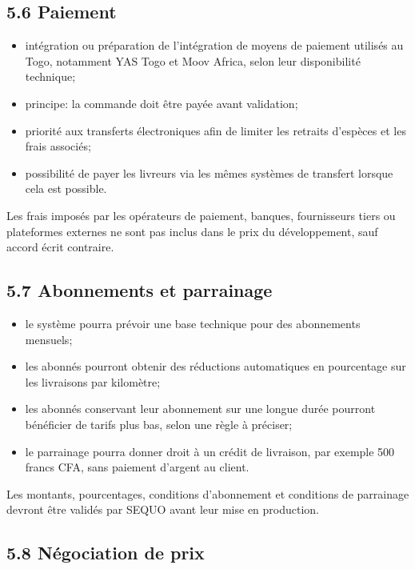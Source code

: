 \documentclass[11pt,a4paper]{article}
\begin{document}
\subsection*{5.6 Paiement}

\begin{itemize}
    \item intégration ou préparation de l'intégration de moyens de paiement utilisés au Togo, notamment YAS Togo et Moov Africa, selon leur disponibilité technique;
    \item principe: la commande doit être payée avant validation;
    \item priorité aux transferts électroniques afin de limiter les retraits d'espèces et les frais associés;
    \item possibilité de payer les livreurs via les mêmes systèmes de transfert lorsque cela est possible.
\end{itemize}

Les frais imposés par les opérateurs de paiement, banques, fournisseurs tiers ou plateformes externes ne sont pas inclus dans le prix du développement, sauf accord écrit contraire.

\subsection*{5.7 Abonnements et parrainage}

\begin{itemize}
    \item le système pourra prévoir une base technique pour des abonnements mensuels;
    \item les abonnés pourront obtenir des réductions automatiques en pourcentage sur les livraisons par kilomètre;
    \item les abonnés conservant leur abonnement sur une longue durée pourront bénéficier de tarifs plus bas, selon une règle à préciser;
    \item le parrainage pourra donner droit à un crédit de livraison, par exemple 500 francs CFA, sans paiement d'argent au client.
\end{itemize}

Les montants, pourcentages, conditions d'abonnement et conditions de parrainage devront être validés par SEQUO avant leur mise en production.

\subsection*{5.8 Négociation de prix}
\end{document}
